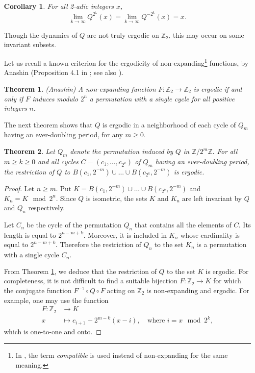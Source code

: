 \documentclass[12pt]{article}
\newtheorem{theorem}{Theorem}
\newtheorem{corollary}{Corollary}
\theoremstyle{definition}
\begin{document}
{\begin{corollary}
For all 2-adic integers $x$,
$$ \lim_{k\rightarrow \infty} Q^{2^k}(x) = \lim_{k\rightarrow \infty} Q^{-2^k}(x) = x.$$
\end{corollary}

Though the dynamics of $Q$ are not truly ergodic on $\mathbb Z_2$, this may occur on some invariant subsets.

Let us recall a known criterion for the ergodicity of non-expanding\footnote{In \cite{Ana06}, the term \textit{compatible} is used instead of non-expanding for the same meaning.} functions, by Anashin (Proposition 4.1 in \cite{Ana06}; see also \cite{Ana14}).
\begin{theorem} {\em (Anashin)} \label{th:ergodic}
A non-expanding function $F: \mathbb Z_2 \rightarrow \mathbb Z_2$ is ergodic if and only if $F$ induces modulo $2^n$ a permutation with a single cycle for all positive integers $n$.
\end{theorem}

The next theorem shows that $Q$ is ergodic in a neighborhood of each cycle of $Q_m$ having an ever-doubling period, for any $m \geq 0$.

\begin{theorem} \label{th:Q_ergodic}
Let $Q_m$ denote the permutation induced by $Q$ in $\mathbb{Z}/2^m\mathbb{Z}$. For all $m \geq k \geq 0$ and all cycles $C= (c_{1}, \ldots, c_{2^k})$ of $Q_m$ having an ever-doubling period, the restriction of $Q$ to $B(c_1, 2^{-m}) \cup \ldots \cup B(c_{2^k}, 2^{-m})$ is ergodic.
\end{theorem}
\begin{proof}
Let $n \geq m$. Put $K=B(c_1, 2^{-m}) \cup \ldots \cup B(c_{2^k}, 2^{-m})$ and $K_n=K \mod 2^n$. Since $Q$ is isometric, the sets $K$ and $K_n$ are left invariant by $Q$ and $Q_n$ respectively.

Let $C_n$ be the cycle of the permutation $Q_n$ that contains all the elements of $C$. Its length is equal to $2^{n-m+k}$. Moreover, it is included in $K_n$ whose cardinality is equal to $2^{n-m+k}$. Therefore the restriction of $Q_n$ to the set $K_n$ is a permutation with a single cycle $C_n$. 

From Theorem \ref{th:ergodic}, we deduce that the restriction of $Q$ to the set $K$ is ergodic. For completeness, it is not difficult to find a suitable bijection $F: \mathbb Z_2 \rightarrow K$ for which the conjugate function $F^{-1} \circ Q \circ F$ acting on $\mathbb Z_2$ is non-expanding and ergodic. For example, one may use the function
$$ \begin{array}{rl}F:  \mathbb Z_2 & \longrightarrow K\\
 x & \longmapsto c_{i+1} + 2^{m-k} (x-i), \quad \text{where }i = x \mod 2^k,
 \end{array}$$
 which is one-to-one and onto.
\end{proof}

}
\end{document}
